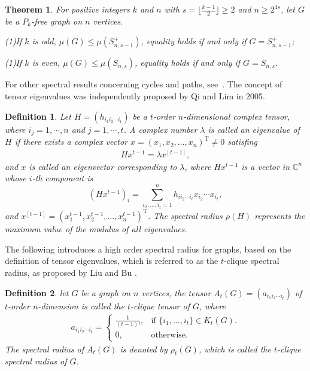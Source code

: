 \documentclass[preprint,12pt]{elsarticle}
\newtheorem{thm}{Theorem}[section]
\newtheorem{defi}{Definition}
\begin{document}
        \begin{thm}\label{CT2-1}\cite{Nikiforov2010}
            For positive integers $k$ and $n$ with $s = \lfloor \frac{k-1}{2} \rfloor \geq 2$ and $n \geq 2^{4s}$, let $G$ be a $P_k$-free graph on $n$ vertices.

            \noindent (1)If $k $ is odd, $\mu(G) \leq \mu(S_{n,s-1}^+)$, equality holds if and only if $G = S_{n,s-1}^+$;

            \noindent (1)If $k $ is even, $\mu(G) \leq \mu(S_{n,s})$, equality holds if and only if $G = S_{n,s}$.
		\end{thm}


        For other spectral results concerning cycles and paths, see~\cite{Zhai2015,Lin2021,Zhai2021,Li2022,Zhang2023,Li2023, Li2024,C2024,Zou2026}. The concept of tensor eigenvalues was independently proposed by Qi \cite{Qi2005} and Lim \cite{Lim2005} in 2005.

        \begin{defi}\cite{Qi2005,Lim2005}
            Let $H = (h_{i_1i_2\cdots i_t})$ be a $t$-order $n$-dimensional complex tensor, where $i_j=1,\cdots,n$ and $j=1,\cdots, t$. A complex number $\lambda$ is called an eigenvalue of $H $ if there exists a complex vector $x=(x_1,x_2,\dots,x_n)^\textrm{T}\neq 0$ satisfing
                \begin{align*}
				    Hx^{t-1} = \lambda x^{[t-1]},
			    \end{align*}
            and $x$ is called an eigenvector corresponding to $\lambda$,
            where $Hx^{t-1}$ is a vector in $\mathbb{C}^n$ whose $i$-th component is
                \begin{equation}\label{align1}
                    (Hx^{t-1})_i=\sum\limits_{i_2,\ldots,i_t=1}^n h_{ii_2\cdots i_t}x_{i_2}\cdots x_{i_t},
                \end{equation}
            and $x^{[t-1]}=(x_1^{t-1},x_2^{t-1},\dots,x_n^{t-1})^\textrm{T}$. The spectral radius $\rho(H)$ represents the maximum value of the modulus of all eigenvalues.
        \end{defi}



        The following introduces a high order spectral radius for graphs, based on the definition of tensor eigenvalues, which is referred to as the $t$-clique spectral radius, as proposed by Liu and Bu \cite{Liu2023}.
        \begin{defi}\cite{Liu2023}
            let $G$ be a graph on $n$ vertices, the tensor $A_t(G) = (a_{i_1i_2\cdots i_t})$ of $t$-order $n$-dimension is called the $t$-clique tensor of $G$, where
			\begin{align*}
                a_{i_1i_2\cdots i_t}=\begin{cases}\frac{1}{(t-1)!},&\text{if }\{i_1,\ldots,i_t\}\in K_t(G).\\0,&\text{otherwise}.\end{cases}
			\end{align*}
            The spectral radius of $A_t(G)$ is denoted by $\rho_t(G)$, which is called the $t$-clique spectral radius of $G$.
        \end{defi}
\end{document}
